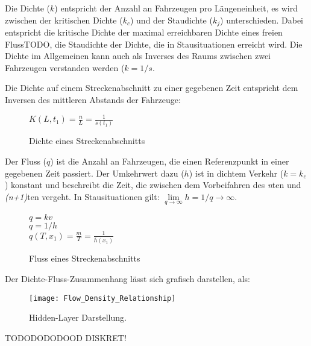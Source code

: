 Die Dichte (\(k\)) entspricht der Anzahl an Fahrzeugen pro Längeneinheit, es wird zwischen der kritischen Dichte (\(k_c\)) und der Staudichte (\(k_j\)) unterschieden. Dabei entspricht die kritische Dichte der maximal erreichbaren Dichte eines freien FlussTODO, die Staudichte der Dichte, die in Stausituationen erreicht wird. Die Dichte im Allgemeinen kann auch als Inverses des Raums zwischen zwei Fahrzeugen verstanden werden (\(k = 1 / s\).

Die Dichte auf einem Streckenabschnitt zu einer gegebenen Zeit entspricht dem Inversen des mittleren Abstands der Fahrzeuge:

\begin{figure}[H]
\( K(L, t_1) = \frac{n}{L} = \frac{1}{\bar{s}(t_1)} \)
    \caption{Dichte eines Streckenabschnitts}
    \label{func:makro_density}
\end{figure}

Der Fluss (\(q\)) ist die Anzahl an Fahrzeugen, die einen Referenzpunkt in einer gegebenen Zeit passiert. Der Umkehrwert dazu (\(h\)) ist in dichtem Verkehr (\(k = k_c\)) konstant und beschreibt die Zeit, die zwischen dem Vorbeifahren des \textit{n}ten und \textit{(n+1)}ten vergeht. In Stausituationen gilt: \(\lim\limits_{q \to \infty}{h = 1/q}\rightarrow\infty\).

\begin{figure}[H]
    \( q=kv \)\\
    \( q=1/h \)\\
    \( q(T, x_1) = \frac{m}{T} = \frac{1}{\bar{h}(x_1)} \)\\
    \caption{Fluss eines Streckenabschnitts}
    \label{func:makro_density}
\end{figure}

Der Dichte-Fluss-Zusammenhang lässt sich grafisch darstellen, als:

\begin{figure}[H]
    \centering
    \texttt{[image: Flow\_Density\_Relationship]}
    \caption{Hidden-Layer Darstellung.}
    \label{fig:hidden-layers}
\end{figure}



TODODODODOOD
DISKRET!